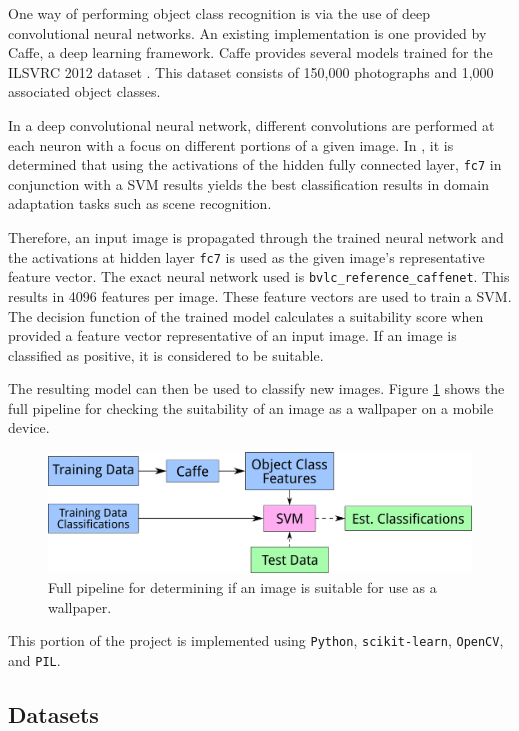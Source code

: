One way of performing object class recognition is via the use of deep
convolutional neural networks.
An existing implementation is one provided by Caffe, a deep learning framework\cite{jia2014caffe}.
Caffe provides several models trained for the ILSVRC 2012 dataset \cite{ILSVRC15}.
This dataset consists of 150,000 photographs and 1,000 associated object classes.

In a deep convolutional neural network, different convolutions are performed at
each neuron with a focus on different portions of a given image.
In \cite{DonahueJVHZTD13}, it is determined that using the activations of the
hidden fully connected layer, \texttt{fc7} in conjunction with a SVM results
yields the best classification results in domain adaptation tasks such as scene recognition.


Therefore, an input image is propagated through the trained neural network and
the activations at hidden layer \texttt{fc7} is used as the given image’s
representative feature vector.
The exact neural network used is \texttt{bvlc\_reference\_caffenet}.
This results in 4096 features per image.
These feature vectors are used to train a SVM.
The decision function of the trained model calculates a suitability score when
provided a feature vector representative of an input image.
If an image is classified as positive, it is considered to be suitable.

The resulting model can then be used to classify new images.
Figure \ref{fig:pipeline_selection} shows the full pipeline for
checking the suitability of an image as a wallpaper on a mobile device.

\begin{figure}
\centering\includegraphics[width=0.7\columnwidth]{../figures/pipeline_suitability.pdf}
\caption{Full pipeline for determining if an image is suitable for use as a wallpaper.\label{fig:pipeline_selection}}
\end{figure}

This portion of the project is implemented using \texttt{Python},
\texttt{scikit-learn}, \texttt{OpenCV}, and \texttt{PIL}.

\subsection{Datasets}

